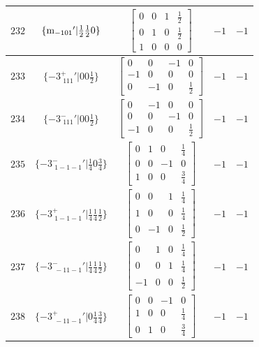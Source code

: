 \documentclass[fleqn,8pt]{jsarticle}
\begin{document}
\begin{longtable}{ccccc}
$ 232 $ & $ \{{\rm m}_{-101}{}'|\frac{1}{2} \frac{1}{2} 0\} $ & $ \begin{bmatrix} 0 & 0 & 1 & \frac{1}{2} \\ 0 & 1 & 0 & \frac{1}{2} \\ 1 & 0 & 0 & 0 \end{bmatrix} $ & $ -1 $ & $ -1 $ \\ \hline
$ 233 $ & $ \{-3^{+}_{\,\,111}{}'|0 0 \frac{1}{2}\} $ & $ \begin{bmatrix} 0 & 0 & -1 & 0 \\ -1 & 0 & 0 & 0 \\ 0 & -1 & 0 & \frac{1}{2} \end{bmatrix} $ & $ -1 $ & $ -1 $ \\ \hline
$ 234 $ & $ \{-3^{-}_{\,\,111}{}'|0 0 \frac{1}{2}\} $ & $ \begin{bmatrix} 0 & -1 & 0 & 0 \\ 0 & 0 & -1 & 0 \\ -1 & 0 & 0 & \frac{1}{2} \end{bmatrix} $ & $ -1 $ & $ -1 $ \\ \hline
$ 235 $ & $ \{-3^{-}_{\,\,1-1-1}{}'|\frac{1}{4} 0 \frac{3}{4}\} $ & $ \begin{bmatrix} 0 & 1 & 0 & \frac{1}{4} \\ 0 & 0 & -1 & 0 \\ 1 & 0 & 0 & \frac{3}{4} \end{bmatrix} $ & $ -1 $ & $ -1 $ \\ \hline
$ 236 $ & $ \{-3^{+}_{\,\,1-1-1}{}'|\frac{1}{4} \frac{1}{4} \frac{1}{2}\} $ & $ \begin{bmatrix} 0 & 0 & 1 & \frac{1}{4} \\ 1 & 0 & 0 & \frac{1}{4} \\ 0 & -1 & 0 & \frac{1}{2} \end{bmatrix} $ & $ -1 $ & $ -1 $ \\ \hline
$ 237 $ & $ \{-3^{-}_{\,\,-11-1}{}'|\frac{1}{4} \frac{1}{4} \frac{1}{2}\} $ & $ \begin{bmatrix} 0 & 1 & 0 & \frac{1}{4} \\ 0 & 0 & 1 & \frac{1}{4} \\ -1 & 0 & 0 & \frac{1}{2} \end{bmatrix} $ & $ -1 $ & $ -1 $ \\ \hline
$ 238 $ & $ \{-3^{+}_{\,\,-11-1}{}'|0 \frac{1}{4} \frac{3}{4}\} $ & $ \begin{bmatrix} 0 & 0 & -1 & 0 \\ 1 & 0 & 0 & \frac{1}{4} \\ 0 & 1 & 0 & \frac{3}{4} \end{bmatrix} $ & $ -1 $ & $ -1 $ \\ \hline

\end{longtable}
\end{document}

